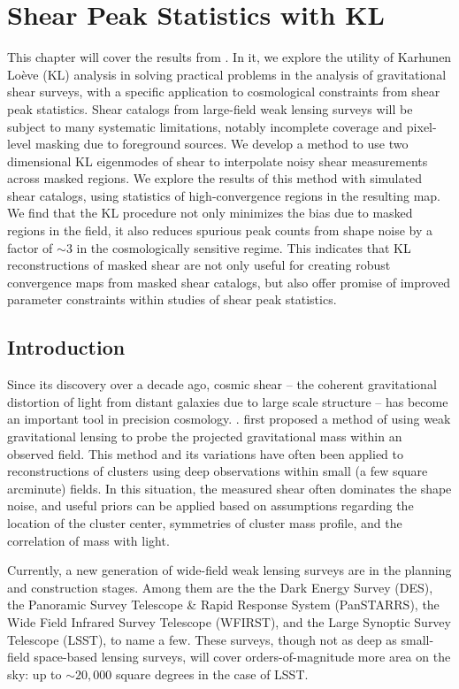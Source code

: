 \chapter{Shear Peak Statistics with KL}

This chapter will cover the results from \citep{Vanderplas2012}. In it,
we explore the utility of Karhunen Lo\`{e}ve (KL) analysis in 
solving practical problems in the analysis of gravitational
shear surveys, with a specific application to cosmological constraints
from shear peak statistics.
Shear catalogs from large-field weak lensing
surveys will be subject to many systematic limitations, notably
incomplete coverage and pixel-level masking due to foreground sources.  
We develop a method to use two dimensional KL eigenmodes of 
shear to interpolate noisy shear measurements across masked regions.  
We explore the results of this method with simulated shear catalogs, 
using statistics of high-convergence regions in the resulting map.  
We find that the KL procedure not only
minimizes the bias due to masked regions in the field, it also reduces
spurious peak counts from shape noise by a factor of $\sim 3$ in the
cosmologically sensitive regime.  This indicates that KL reconstructions 
of masked shear are not only useful for creating robust convergence maps
from masked shear catalogs, but also offer promise of improved parameter
constraints within studies of shear peak statistics.


\section{Introduction}
Since its discovery over a decade ago, cosmic shear -- the coherent 
gravitational distortion of light from distant galaxies due to large
scale structure -- has become an important tool in precision cosmology.
\citep[see][for a review]{Bartelmann01}.  
\citet{Kaiser95} first proposed a method of using weak gravitational lensing
to probe the projected gravitational mass within an observed field.  This 
method and its variations have often been applied to reconstructions of
clusters using deep observations within small (a few square arcminute) fields.
In this situation, the measured shear often dominates the shape noise, and 
useful priors can be applied based on assumptions regarding 
the location of the cluster center, symmetries of cluster mass profile, 
and the correlation of mass with light.

Currently, a new generation of wide-field weak lensing surveys are
in the planning and construction stages.  
Among them are the the Dark Energy Survey (DES), 
the Panoramic Survey Telescope \& Rapid
Response System (PanSTARRS), the Wide Field Infrared Survey Telescope (WFIRST),
and the Large Synoptic Survey Telescope (LSST), to name a few.
These surveys, though not as deep as small-field space-based lensing surveys,
will cover orders-of-magnitude more area on the sky: up to $\sim 20,000$
square degrees in the case of LSST.

